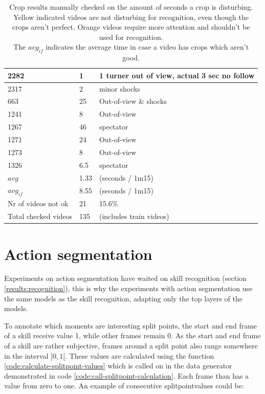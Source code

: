 \begin{table}[h!]
\begin{tabular}{|l|l|l|}
        2282 &	\cellcolor{yellow!25} 1    &	1 turner out of view, actual 3 sec no follow \\ \hline
        2317 &	\cellcolor{yellow!25} 2    &	minor shocks \\ \hline
        663  &	\cellcolor{orange!25} 25   &	Out-of-view \& shocks \\ \hline
        1241 &	\cellcolor{orange!25} 8    &	Out-of-view \\ \hline
        1267 &	\cellcolor{orange!25} 46   &	spectator \\ \hline
        1271 &	\cellcolor{orange!25} 24   &	Out-of-view \\ \hline
        1273 &	\cellcolor{orange!25} 8    &	Out-of-view \\ \hline
        1326 &	\cellcolor{orange!25} 6.5  &	spectator \\ \hline
        \(avg\) &	1.33 &	(seconds / 1m15) \\ \hline
        \(avg_{if}\) &	8.55 &	(seconds / 1m15) \\ \hline
        Nr of videos not ok &	21	& 15.6\% \\ \hline
        Total checked videos &	135	& (includes train videos) \\ \hline
    \end{tabular}
    \caption{Crop results manually checked on the amount of seconds a crop is disturbing. \\
    Yellow indicated videos are not disturbing for recognition, even though the crops aren't perfect. Orange videos require more attention and shouldn't be used for recognition. \\
    The \(avg_{if}\) indicates the average time in case a video has crops which aren't good.}
    \label{tbl:crop-results}
\end{table}









\section{Action segmentation}

Experiments on action segmentation have waited on skill recognition (section \ref{results:recognition}), this is why the experiments with action segmentation use the same models as the skill recognition, adapting only the top layers of the models.

To annotate which moments are interesting split points, the start and end frame of a skill receive value 1, while other frames remain 0.
As the start and end frame of a skill are rather subjective, frames around a split point also range somewhere in the interval \(]0, 1[\). These values are calculated using the function \ref{code:calculate-splitpoint-values} which is called on in the data generator demonstrated in code \ref{code:call-splitpoint-calculation}.
Each frame than has a value from zero to one. An example of consecutive splitpointvalues could be:

